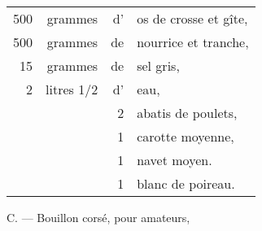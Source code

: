 \footnotesize
\begin{longtable}{rrrp{16em}}
  500 & grammes    & d' & os de crosse et gîte,                                                           \\
  500 & grammes    & de & nourrice et tranche,                                                            \\
   15 & grammes    & de & sel gris,                                                                       \\
    2 & litres 1/2 & d' &  eau,                                                                           \\
      &            & 2  & abatis de poulets,                                                              \\
      &            & 1  & carotte moyenne,                                                                \\
      &            & 1  & navet moyen.                                                                    \\
      &            & 1  & blanc de poireau.                                                               \\
\end{longtable}
\normalsize                                

\label{pg0202} \hypertarget{p0202}{}
C. — Bouillon corsé, pour amateurs,

\medskip

